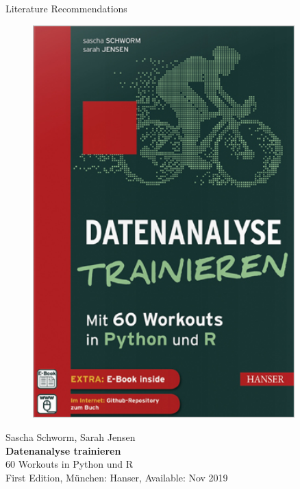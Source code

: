 \documentclass[document.tex]{subfiles}
\begin{document}
\begin{frame}{Literature Recommendations}
\begin{minipage}{0.1\textwidth}
\begin{figure}[H]
                \includegraphics[height=0.2\textheight, width=0.9\textwidth, left]{assets/book-covers/schworm2019.jpg}
            \end{figure}
        \end{minipage}
        \begin{minipage}{0.39\textwidth}
            \footnotesize Sascha Schworm, Sarah Jensen \normalsize \\[-0.5mm]
            \small \textbf{Datenanalyse trainieren} \\[-0.8mm]
            60 Workouts in Python und R \normalsize \\
            \tiny First Edition, München: Hanser, Available: Nov 2019 \normalsize
        \end{minipage}
    \end{frame}
\end{document}
